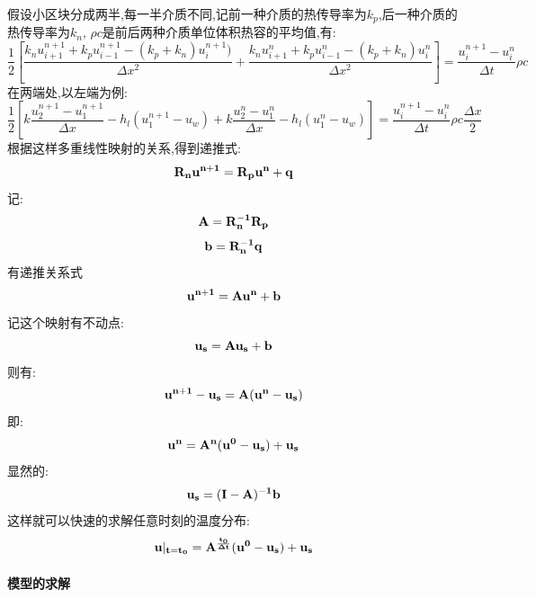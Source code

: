 \documentclass{cumcmthesis}
\begin{document}
            假设小区块分成两半,每一半介质不同,记前一种介质的热传导率为\(k_p\),后一种介质的热传导率为\(k_n\),
            \(\rho c\)是前后两种介质单位体积热容的平均值,有:
            \[
                \frac{1}{2}
                \left[
                    \frac{k_n u_{i+1}^{n+1} + k_p u_{i-1}^{n+1} - (k_p+k_n)u_{i}^{n+1}) }{\Delta x^2}
                    +
                    \frac{k_n u_{i+1}^{n} + k_p u_{i-1}^{n} - (k_p+k_n)u_{i}^{n} }{\Delta x^2}
                \right]
                =
                \frac{ u_{i}^{n+1} - u_{i}^{n} }{\Delta t} \rho c
            \]
            在两端处,以左端为例:
            \[
                \frac{1}{2}
                \left[
                    k\frac{ u_{2}^{n+1}  - u_{1}^{n+1} }{\Delta x}
                    -
                    h_l(u_{1}^{n+1} - u_w)
                    +
                    k\frac{ u_{2}^{n}  - u_{1}^{n} }{\Delta x}
                    -
                    h_l(u_{1}^{n} - u_w)
                \right]
                =
                \frac{ u_{i}^{n+1} - u_{i}^{n} }{\Delta t} \rho c \frac{\Delta x}{2}
            \]
            根据这样多重线性映射的关系,得到递推式:
            \[\bf{R_n}\bf{u}^{n+1} = \bf{R_p}\bf{u}^{n} + \bf{q}\]
            记:
            \[\bf{A} = \bf{R}_n^{-1}\bf{R}_p\]
            \[\bf{b} = \bf{R}_n^{-1}\bf{q}\]
            有递推关系式
            \[\bf{u}^{n+1} = \bf{A}\bf{u}^{n} + \bf{b}\]
            记这个映射有不动点:
            \[\bf{u}_s = \bf{A}\bf{u}_s + \bf{b}\]
            则有:
            \[ \bf{u}^{n+1} - \bf{u}_s = \bf{A} (\bf{u}^n - \bf{u}_s) \]
            即:
            \[\bf{u}^{n} = \bf{A}^n (\bf{u}^0 - \bf{u}_s) + \bf{u}_s\]
            显然的:
            \[\bf{u}_s = (\bf{I} - \bf{A})^{-1}\bf{b}\]
            这样就可以快速的求解任意时刻的温度分布:
            \[\bf{u}|_{t = t_0} = \bf{A}^{\frac{t_0}{\Delta t}} (\bf{u}^0 - \bf{u}_s) + \bf{u}_s\]

        \paragraph{模型的求解}
\end{document}
